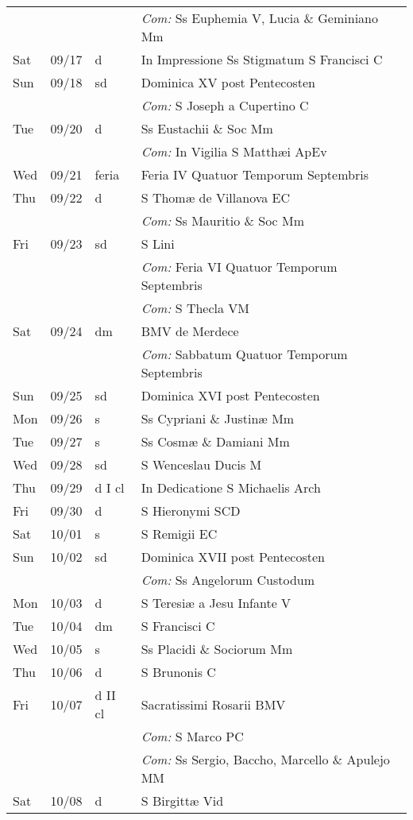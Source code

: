 \documentclass[10pt]{article}
\begin{document}
\begin{longtable}{ l l l l }
 & & & \textit{Com:} Ss Euphemia V, Lucia \& Geminiano Mm\\
Sat & 09/17 & d & In Impressione Ss Stigmatum S Francisci C\\
Sun & 09/18 & sd & Dominica XV post Pentecosten\\
 & & & \textit{Com:} S Joseph a Cupertino C\\
Tue & 09/20 & d & Ss Eustachii \& Soc Mm\\
 & & & \textit{Com:} In Vigilia S Matthæi ApEv\\
Wed & 09/21 & feria & Feria IV Quatuor Temporum Septembris\\
Thu & 09/22 & d & S Thomæ de Villanova EC\\
 & & & \textit{Com:} Ss Mauritio \& Soc Mm\\
Fri & 09/23 & sd & S Lini\\
 & & & \textit{Com:} Feria VI Quatuor Temporum Septembris\\
 & & & \textit{Com:} S Thecla VM\\
Sat & 09/24 & dm & BMV de Merdece\\
 & & & \textit{Com:} Sabbatum Quatuor Temporum Septembris\\
Sun & 09/25 & sd & Dominica XVI post Pentecosten\\
Mon & 09/26 & s & Ss Cypriani \& Justinæ Mm\\
Tue & 09/27 & s & Ss Cosmæ \& Damiani Mm\\
Wed & 09/28 & sd & S Wenceslau Ducis M\\
Thu & 09/29 & d I cl & In Dedicatione S Michaelis Arch\\
Fri & 09/30 & d & S Hieronymi SCD\\
Sat & 10/01 & s & S Remigii EC\\
Sun & 10/02 & sd & Dominica XVII post Pentecosten\\
 & & & \textit{Com:} Ss Angelorum Custodum\\
Mon & 10/03 & d & S Teresiæ a Jesu Infante V\\
Tue & 10/04 & dm & S Francisci C\\
Wed & 10/05 & s & Ss Placidi \& Sociorum Mm\\
Thu & 10/06 & d & S Brunonis C\\
Fri & 10/07 & d II cl & Sacratissimi Rosarii BMV\\
 & & & \textit{Com:} S Marco PC\\
 & & & \textit{Com:} Ss Sergio, Baccho, Marcello \& Apulejo MM\\
Sat & 10/08 & d & S Birgittæ Vid\\

\end{longtable}
\end{document}
